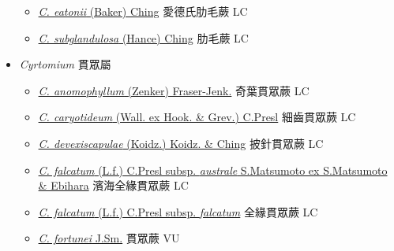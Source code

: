 \begin{itemize}
  \begin{itemize}
        \item[] \href{http://www.theplantlist.org/tpl1.1/search?q=Ctenitis+eatonii}{\textit{C. eatonii} (Baker) Ching}   愛德氏肋毛蕨 LC
        \item[] \href{http://www.theplantlist.org/tpl1.1/search?q=Ctenitis+subglandulosa}{\textit{C. subglandulosa} (Hance) Ching}   肋毛蕨 LC
  \end{itemize}
 \item[] \textit{Cyrtomium} 貫眾屬
                    
  \begin{itemize}
        \item[] \href{http://www.theplantlist.org/tpl1.1/search?q=Cyrtomium+anomophyllum}{\textit{C. anomophyllum} (Zenker) Fraser-Jenk.}   奇葉貫眾蕨 LC
        \item[] \href{http://www.theplantlist.org/tpl1.1/search?q=Cyrtomium+caryotideum}{\textit{C. caryotideum} (Wall. ex Hook. \& Grev.) C.Presl}   細齒貫眾蕨 LC
        \item[] \href{http://www.theplantlist.org/tpl1.1/search?q=Cyrtomium+devexiscapulae}{\textit{C. devexiscapulae} (Koidz.) Koidz. \& Ching}   披針貫眾蕨 LC
        \item[] \href{http://www.theplantlist.org/tpl1.1/search?q=Cyrtomium+falcatum+subsp.+australe}{\textit{C. falcatum} (L.f.) C.Presl subsp. \textit{australe} S.Matsumoto ex S.Matsumoto \& Ebihara}   濱海全緣貫眾蕨 LC
        \item[] \href{http://www.theplantlist.org/tpl1.1/search?q=Cyrtomium+falcatum+subsp.+falcatum}{\textit{C. falcatum} (L.f.) C.Presl subsp. \textit{falcatum}}   全緣貫眾蕨 LC
        \item[] \href{http://www.theplantlist.org/tpl1.1/search?q=Cyrtomium+fortunei}{\textit{C. fortunei} J.Sm.}   貫眾蕨 VU

\end{itemize}
\end{itemize}
